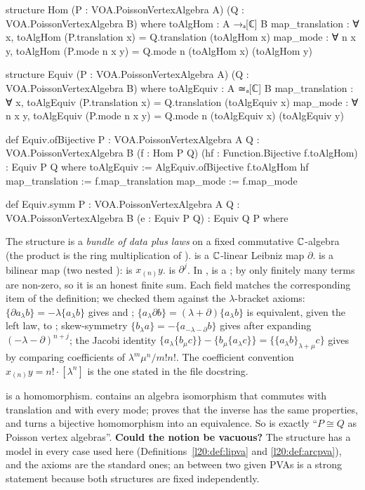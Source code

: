 \begin{leancode}
structure Hom (P : VOA.PoissonVertexAlgebra A) (Q : VOA.PoissonVertexAlgebra B) where
  toAlgHom : A →ₐ[ℂ] B
  map_translation : ∀ x, toAlgHom (P.translation x) = Q.translation (toAlgHom x)
  map_mode : ∀ n x y, toAlgHom (P.mode n x y) = Q.mode n (toAlgHom x) (toAlgHom y)

structure Equiv (P : VOA.PoissonVertexAlgebra A) (Q : VOA.PoissonVertexAlgebra B) where
  toAlgEquiv : A ≃ₐ[ℂ] B
  map_translation : ∀ x, toAlgEquiv (P.translation x) = Q.translation (toAlgEquiv x)
  map_mode : ∀ n x y, toAlgEquiv (P.mode n x y) = Q.mode n (toAlgEquiv x) (toAlgEquiv y)

def Equiv.ofBijective {P : VOA.PoissonVertexAlgebra A} {Q : VOA.PoissonVertexAlgebra B}
    (f : Hom P Q) (hf : Function.Bijective f.toAlgHom) : Equiv P Q where
  toAlgEquiv := AlgEquiv.ofBijective f.toAlgHom hf
  map_translation := f.map_translation
  map_mode := f.map_mode

def Equiv.symm {P : VOA.PoissonVertexAlgebra A} {Q : VOA.PoissonVertexAlgebra B}
    (e : Equiv P Q) : Equiv Q P where
\end{leancode}

\begin{dictionary}
The structure is a \emph{bundle of data plus laws} on a fixed commutative ${\mathbb{C}}$-algebra  (the
product is the ring multiplication of ).  is a ${\mathbb{C}}$-linear Leibniz map
$\partial$.  is a bilinear map (two nested ):  is $x_{(n)}y$.
 is $\partial^j$. In ,  is a ; by
 only finitely many terms are non-zero, so it is an honest finite sum. Each field matches the
corresponding item of the definition; we checked them against the $\lambda$-bracket axioms:
$\{\partial a_\lambda b\}=-\lambda\{a_\lambda b\}$ gives  and
; $\{a_\lambda\partial b\}=(\lambda+\partial)\{a_\lambda b\}$ is equivalent, given
the left law, to ; skew-symmetry $\{b_\lambda a\}=-\{a_{-\lambda-\partial}b\}$ gives
 after expanding $(-\lambda-\partial)^{n+j}$; the Jacobi identity
$\{a_\lambda\{b_\mu c\}\}-\{b_\mu\{a_\lambda c\}\}=\{\{a_\lambda b\}_{\lambda+\mu}c\}$ gives  by
comparing coefficients of $\lambda^m\mu^n/m!n!$. The coefficient convention $x_{(n)}y=n!\cdot[\lambda^n]$ is
the one stated in the file docstring.

 is a homomorphism.  contains an algebra isomorphism  that commutes with
translation and with every mode;  proves that the inverse has the same properties, and
 turns a bijective homomorphism into an equivalence. So
 is exactly ``$P\cong Q$ as Poisson vertex algebras''.
\textbf{Could the notion be vacuous?} The structure has a model in every case used here
(Definitions~\ref{l20:def:lipva} and \ref{l20:def:arcpva}), and the axioms are the standard ones; an
 between two given PVAs is a strong statement because both structures are fixed independently.
\end{dictionary}

